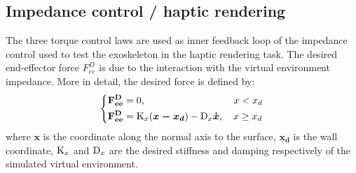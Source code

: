 \documentclass[journal]{IEEEtran}
\newcommand{\vect}[1]{\mathbf{#1}}
\newcommand{\vectm}[1]{ { {\text #1} }}
\newcommand{\vects}[1]{{\boldsymbol {#1}}}
\begin{document}
%


\subsection{Impedance control / haptic rendering} \label{sub:impedanceCJICF}

The three torque control laws are used as inner feedback loop of the impedance control used to test the exoskeleton in the haptic rendering task. The desired end-effector force $F_{ee}^D$ is due to the interaction with the virtual environment impedance. More in detail, the desired force is defined by:
%
\begin{equation}
\label{eq:desiredVE}
\left \{
\begin{aligned}
& \vect{ F_{ee}^D} = 0, \ \ \ \quad \quad \quad \quad \quad \quad \quad \quad  x < x_d \\
& \vect{F_{ee}^D} = \vectm{K_x} (\vects{x - x_d}) - \vectm{D_x}\vects{\dot{x}}, \quad  x \geq x_d  \\
\end{aligned}
\right .
\end{equation}
%
%
%
where $\vect{x}$ is the coordinate along the normal axis to the surface, $\vect{x_d}$   is the wall coordinate, $\vectm{K_x}$ and $\vectm{D_x}$ are the desired stiffness and damping respectively of the simulated virtual environment.
\end{document}
